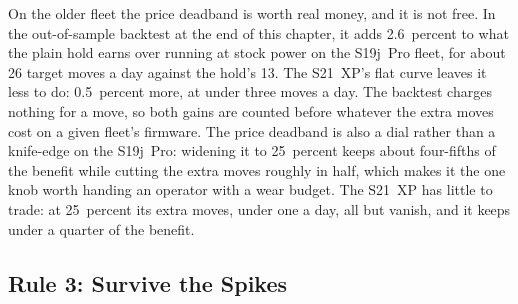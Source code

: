 On the older fleet the price deadband is worth real money, and it is not free. In the out-of-sample backtest at the end of this chapter, it adds 2.6~percent to what the plain hold earns over running at stock power on the S19j~Pro fleet, for about 26 target moves a day against the hold's 13. The S21~XP's flat curve leaves it less to do: 0.5~percent more, at under three moves a day. %
The backtest charges nothing for a move, so both gains are counted before whatever the extra moves cost on a given fleet's firmware. %
The price deadband is also a dial rather than a knife-edge on the S19j~Pro: widening it to 25~percent keeps about four-fifths of the benefit while cutting the extra moves roughly in half, which makes it the one knob worth handing an operator with a wear budget. The S21~XP has little to trade: at 25~percent its extra moves, under one a day, all but vanish, and it keeps under a quarter of the benefit. %

\subsection{Rule 3: Survive the Spikes}

